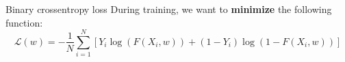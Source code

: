 \bgroup
\begin{frame}{Binary crossentropy loss}
During training, we want to \textbf{minimize} the following function:
\begin{equation*}
\mathcal{L}(w) = -\frac{1}{N} \sum_{i=1}^N [Y_i \log(F(X_i, w)) + (1 - Y_i)\log(1-F(X_i, w))]
\end{equation*}
\end{frame}
\egroup